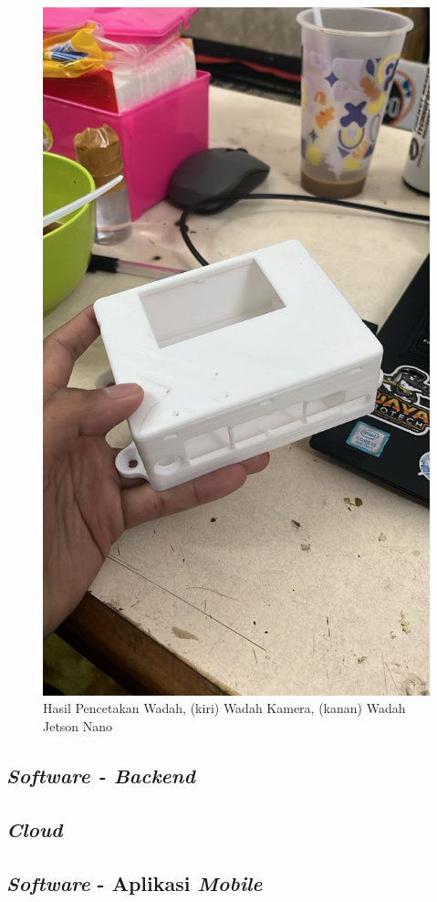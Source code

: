 \begin{figure}
  \includegraphics[scale=0.15]{gambar/bab3-case-jnano-printed.jpeg}

  \caption{\centering Hasil Pencetakan Wadah, (kiri) Wadah Kamera, (kanan) Wadah Jetson Nano}
  \label{fig:printcontainer}
\end{figure}

\subsection{\emph{Software - Backend}}

\lipsum[1]

\subsection{\emph{Cloud}}

\lipsum[1]

\subsection{\emph{Software} - Aplikasi \emph{Mobile}}

\lipsum[1]